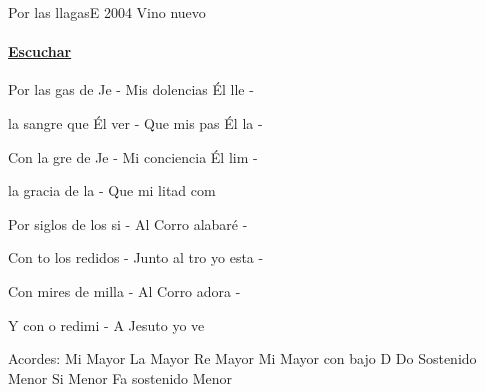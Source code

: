 \documentclass[12pt, spanish]{book}
\begin{document}
    \begin{song}{Por las llagas}{E}
    {2004} %
    {Vino nuevo}
    {} %
    {}
        \ifChordBk
            \paragraph{\mbox{}\hfill\protect\href{https://open.spotify.com/intl-es/track/127BY9LPFhtLMu3pkmXcrh}{Escuchar}\mbox{}\hfill}
        \fi


        \begin{SBOpGroup}
            Por las gas de Je - Mis dolencias Él lle -

             la sangre que Él ver - Que mis pas Él la -

            Con la gre de Je - Mi conciencia Él lim -

             la gracia de la  - Que mi litad com
        \end{SBOpGroup}

        \begin{SBChorus}
            Por  siglos de los si - Al Corro alabaré -

            Con to los redidos - Junto al tro yo esta -

            Con mires de milla - Al Corro adora -

            Y con o redimi - A Jesuto yo ve
        \end{SBChorus}

        \ifChordBk
        \begin{SBOpGroup}
            Acordes:\break
            \upchord{\E}\qquad Mi Mayor \hfill
            \upchord{\A}\qquad La Mayor \hfill\null\break
            \upchord{\D}\qquad Re Mayor \hfill
            \upchord{\ED}\qquad Mi Mayor con bajo D \hfill\null\break
            \upchord{\Csm}Do Sostenido Menor \hfill
            \upchord{\Bm}\qquad Si Menor \hfill\null\break
            \upchord{\Fsm}Fa sostenido Menor \hfill\null\break
        \end{SBOpGroup}
        \fi
    \end{song}
\end{document}
